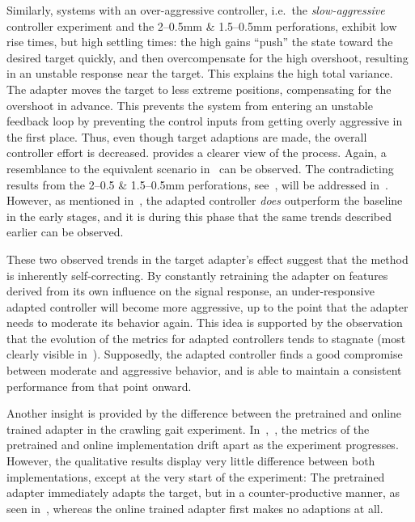 Similarly, systems with an over-aggressive controller, i.e.~the \emph{slow-aggressive} controller experiment and the 2--0.5\si{\mm} \& 1.5--0.5\si{\mm} perforations, exhibit low rise times, but high settling times: the high gains ``push'' the state toward the desired target quickly, and then overcompensate for the high overshoot, resulting in an unstable response near the target.
This explains the high total variance.
The adapter moves the target to less extreme positions, compensating for the overshoot in advance.
This prevents the system from entering an unstable feedback loop by preventing the control inputs from getting overly aggressive in the first place.
Thus, even though target adaptions are made, the overall controller effort is decreased.
 provides a clearer view of the process.
Again, a resemblance to the equivalent scenario in~ can be observed.
The contradicting results from the 2--0.5 \& 1.5--0.5\si{\mm} perforations, see~, will be addressed in~.
However, as mentioned in~, the adapted controller \emph{does} outperform the baseline in the early stages, and it is during this phase that the same trends described earlier can be observed.

These two observed trends in the target adapter's effect suggest that the method is inherently self-correcting.
By constantly retraining the adapter on features derived from its own influence on the signal response, an under-responsive adapted controller will become more aggressive, up to the point that the adapter needs to moderate its behavior again.
This idea is supported by the observation that the evolution of the metrics for adapted controllers tends to stagnate (most clearly visible in~).
Supposedly, the adapted controller finds a good compromise between moderate and aggressive behavior, and is able to maintain a consistent performance from that point onward.

Another insight is provided by the difference between the pretrained and online trained adapter in the crawling gait experiment.
In~,~, the metrics of the pretrained and online implementation drift apart as the experiment progresses.
However, the qualitative results display very little difference between both implementations, except at the very start of the experiment: The pretrained adapter immediately adapts the target, but in a counter-productive manner, as seen in~, whereas the online trained adapter first makes no adaptions at all.


